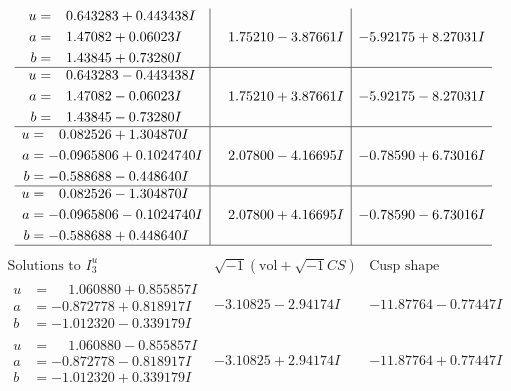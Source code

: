 \documentclass[1p]{elsarticle_modified}
\theoremstyle{definition}
\newcommand{\I}{\sqrt{-1}}
\begin{document}
$$\begin{array}{c|c|c}
\begin{aligned}
u &= \phantom{-}0.643283 + 0.443438 I \\
a &= \phantom{-}1.47082 + 0.06023 I \\
b &= \phantom{-}1.43845 + 0.73280 I\end{aligned}
 & \phantom{-}1.75210 - 3.87661 I & -5.92175 + 8.27031 I \\ \hline\begin{aligned}
u &= \phantom{-}0.643283 - 0.443438 I \\
a &= \phantom{-}1.47082 - 0.06023 I \\
b &= \phantom{-}1.43845 - 0.73280 I\end{aligned}
 & \phantom{-}1.75210 + 3.87661 I & -5.92175 - 8.27031 I \\ \hline\begin{aligned}
u &= \phantom{-}0.082526 + 1.304870 I \\
a &= -0.0965806 + 0.1024740 I \\
b &= -0.588688 - 0.448640 I\end{aligned}
 & \phantom{-}2.07800 - 4.16695 I & -0.78590 + 6.73016 I \\ \hline\begin{aligned}
u &= \phantom{-}0.082526 - 1.304870 I \\
a &= -0.0965806 - 0.1024740 I \\
b &= -0.588688 + 0.448640 I\end{aligned}
 & \phantom{-}2.07800 + 4.16695 I & -0.78590 - 6.73016 I\\
 \hline 
 \end{array}$$\newpage$$\begin{array}{c|c|c}  
\text{Solutions to }I^u_{3}& \I (\text{vol} + \sqrt{-1}CS) & \text{Cusp shape}\\
 \hline 
\begin{aligned}
u &= \phantom{-}1.060880 + 0.855857 I \\
a &= -0.872778 + 0.818917 I \\
b &= -1.012320 - 0.339179 I\end{aligned}
 & -3.10825 - 2.94174 I & -11.87764 - 0.77447 I \\ \hline\begin{aligned}
u &= \phantom{-}1.060880 - 0.855857 I \\
a &= -0.872778 - 0.818917 I \\
b &= -1.012320 + 0.339179 I\end{aligned}
 & -3.10825 + 2.94174 I & -11.87764 + 0.77447 I \\ \hline\begin{aligned}

\end{aligned}
\end{array}$$
\end{document}
